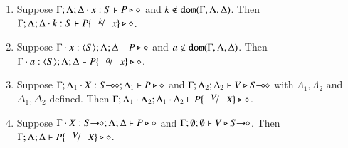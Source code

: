 \begin{lemma}\rm
	\label{l:subst}
	\begin{enumerate}[1.]
		\item	Suppose
			$\Gamma; \Lambda; \Delta \cdot x:S \vdash P \triangleright \diamond$
			and
			$k \not\in \mathtt{dom}(\Gamma, \Lambda, \Delta)$.
			Then
			$\Gamma; \Lambda; \Delta \cat k:S  \vdash P\subst{k}{x} \hastype \Proc$.

		\item	Suppose $\Gamma \cdot x:\langle S \rangle; \Lambda; \Delta \vdash P \triangleright \diamond$
			and
			$a \not\in \mathtt{dom}(\Gamma, \Lambda, \Delta)$. 
			Then
			$\Gamma \cat a:\chtype{S}; \Lambda; \Delta \vdash P\subst{a}{x} \hastype \Proc$.

		\item	Suppose $\Gamma; \Lambda_1 \cdot X:S\!\! \multimap\!\! \diamond; \Delta_1  \vdash P \triangleright \diamond$ 
			and
			$\Gamma; \Lambda_2; \Delta_2  \vdash V \triangleright S\!\! \multimap\!\! \diamond$
			with 
			$\Lambda_1, \Lambda_2$ and $\Delta_1, \Delta_2$
			defined.  
			Then
			$\Gamma; \Lambda_1 \cat \Lambda_2; \Delta_1 \cat \Delta_2  \proves P\subst{V}{X} \hastype \Proc$.

		\item	Suppose
			$\Gamma \cdot X:S\!\! \rightarrow\!\! \diamond; \Lambda; \Delta  \vdash P \triangleright \diamond$
			and
			$\Gamma; \emptyset ; \emptyset  \vdash V \triangleright S\!\! \rightarrow\!\! \diamond$.
			Then $\Gamma; \Lambda; \Delta  \proves P\subst{V}{X} \hastype \Proc$.
	\end{enumerate}
\end{lemma}

